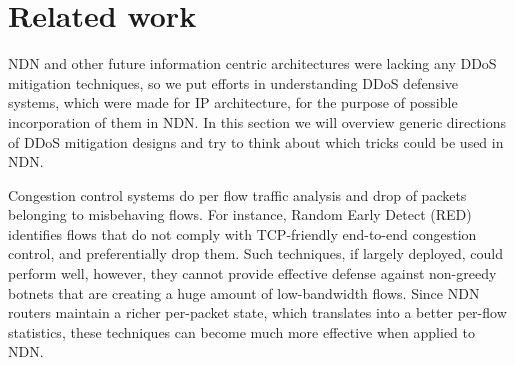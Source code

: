 \section{Related work}
\label{sec:related work}

NDN and other future information centric architectures were lacking any DDoS mitigation techniques, so we put efforts in understanding DDoS defensive systems, which were made for IP architecture, for the purpose of possible incorporation of them in NDN. In this section we will overview generic directions of DDoS mitigation designs and try to think about which tricks could be used in NDN.  
  


Congestion control systems do per flow traffic analysis and drop of packets belonging to misbehaving flows. For instance, Random Early Detect (RED)~\cite{RED} identifies flows that do not comply with TCP-friendly end-to-end congestion control, and preferentially drop them. Such techniques, if largely deployed, could perform well, however, they cannot provide effective defense against non-greedy botnets that are creating a huge amount of low-bandwidth flows. Since NDN routers maintain a richer per-packet state, which translates into a better per-flow statistics, these techniques can become much more effective when applied to NDN.

